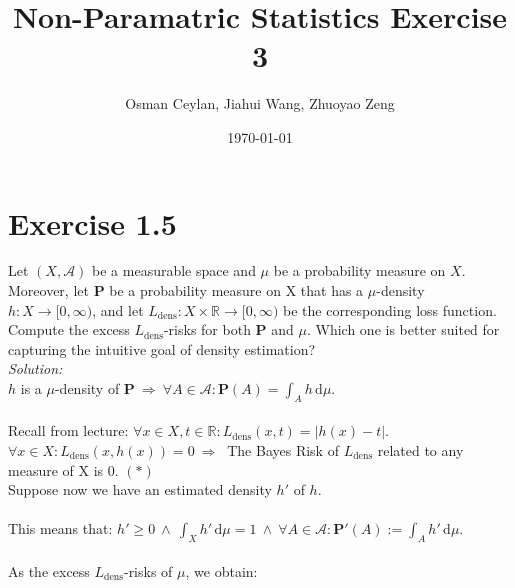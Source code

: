 \documentclass{article}
\title{Non-Paramatric Statistics Exercise 3}
\author{Osman Ceylan, Jiahui Wang, Zhuoyao Zeng}
\date{\today}
\begin{document}
\maketitle
\section*{Exercise 1.5}
Let $(X,\mathcal{A})$ be a measurable space and $\mu$ be a probability measure on $X$. Moreover, let $\mathbf{P}$ be a probability measure on X that has a $\mu$-density $h: X \rightarrow [0,\infty)$, and let $L_{\text{dens}}: X \times \mathbb{R} \rightarrow [0,\infty)$ be the corresponding loss function. Compute the excess $L_{\text{dens}}$-risks for both $\mathbf{P}$ and $\mu$. Which one is better suited for capturing the intuitive goal of density estimation? \\
\textit{Solution: }\\
$h$ is a $\mu$-density of $\mathbf{P} \ \Rightarrow \  \forall A\in \mathcal{A}: \mathbf{P}(A) = \displaystyle{\int_A h \, \text{d}\mu}$.\\
\vspace*{-1.3em}\\
Recall from  lecture: $\forall x\in X, t\in \mathbb{R}: L_{\text{dens}}(x,t) = |h(x)-t|$.\\
$\forall x\in X:  L_{\text{dens}}(x,h(x)) =  0 \ \Rightarrow \  $ The Bayes Risk of $L_{\text{dens}}$ related to any measure of X is 0. \hspace{2em}$(*)$\\
Suppose now we have an estimated density $h'$ of $h$.\\
\vspace*{-1.5em}\\
This means that: $h'\geq 0 \ \land \ \displaystyle{\int_X h' \, \text{d}\mu = 1} \ \land \ \forall A\in \mathcal{A}:\mathbf{P}'(A):= \displaystyle{\int_A h' \, \text{d}\mu } $.\\
\vspace*{-1.3em}\\
As the excess $L_{\text{dens}}$-risks of $\mu$, we obtain:
\end{document}
